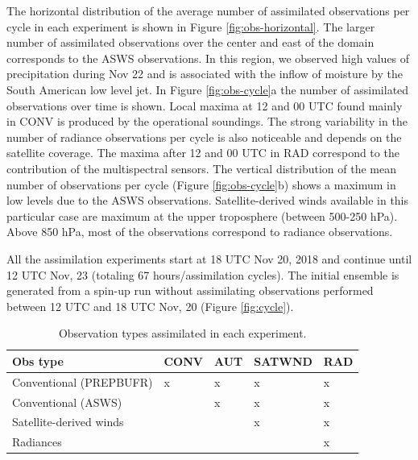 \documentclass[final,5p,times,twocolumn,authoryear]{elsarticle} %
\begin{document}
The horizontal distribution of the average number of assimilated observations per cycle in each experiment is shown in Figure \ref{fig:obs-horizontal}. The larger number of assimilated observations over the center and east of the domain corresponds to the ASWS observations. In this region, we observed high values of precipitation during Nov 22 and is associated with the inflow of moisture by the South American low level jet. In Figure \ref{fig:obs-cycle}a the number of assimilated observations over time is shown. Local maxima at 12 and 00 UTC found mainly in CONV is produced by the operational soundings. The strong variability in the number of radiance observations per cycle is also noticeable and depends on the satellite coverage. The maxima after 12 and 00 UTC in RAD correspond to the contribution of the multispectral sensors. The vertical distribution of the mean number of observations per cycle (Figure \ref{fig:obs-cycle}b) shows a maximum in low levels due to the ASWS observations. Satellite-derived winds available in this particular case are maximum at the upper troposphere (between 500-250 hPa). Above 850 hPa, most of the observations correspond to radiance observations.

All the assimilation experiments start at 18 UTC Nov 20, 2018 and continue until 12 UTC Nov, 23 (totaling 67 hours/assimilation cycles). The initial ensemble is generated from a spin-up run without assimilating observations performed between 12 UTC and 18 UTC Nov, 20 (Figure \ref{fig:cycle}).

\begin{table}

\caption{\label{tab:table-exp}Observation types assimilated in each experiment.}
\centering
\begin{tabu} to 
\toprule
Obs type & CONV & AUT & SATWND & RAD\\
\midrule
Conventional (PREPBUFR) & x & x & x & x\\
Conventional (ASWS) &  & x & x & x\\
Satellite-derived winds &  &  & x & x\\
Radiances &  &  &  & x\\
\bottomrule
\end{tabu}
\end{table}
\end{document}
